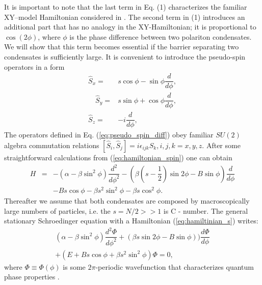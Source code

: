 \documentclass[fleqn,10pt]{wlscirep}
\begin{document}
It is important to note that the last term in Eq. (1) characterizes the familiar XY--model Hamiltonian  considered in
\cite{Lago1, Lago2}.
The second term in (1) introduces an additional part that has no analogy in the XY-Hamiltonian; it is proportional to $\cos(2\phi)$, where $\phi$ is the phase difference between two polariton condensates.
We will show that this term becomes essential if the barrier separating two condensates is sufficiently large.
It is convenient to introduce the pseudo-spin operators in a form
% 
\begin{subequations}
\begin{align}
\hat{S}_x = & s \cos{\phi} - \sin{\phi} \dfrac{d}{d \phi}, \\
\quad \hat{S}_y = & s \sin{\phi} + \cos{\phi} \dfrac{d}{d \phi}, \\
\hat{S}_z = & -i\dfrac{d}{d \phi},
\end{align}
\label{eq:pseudo_spin_diff}
\end{subequations}
%
The operators defined in Eq. (\ref{eq:pseudo_spin_diff}) obey familiar $SU(2)$ algebra commutation relations $[\hat{S}_i, \hat{S}_j] = i\epsilon_{ijk}\hat{S}_k,  i,j,k=x,y,z$.
After some straightforward calculations from (\ref{eq:hamiltonian_spin}) one can obtain
%
\begin{equation}
\begin{array}{lcl}
H & = & -(\alpha - \beta \sin^2 \phi) \dfrac{d^2}{d \phi^2} - (\beta(s-\dfrac{1}{2})\sin{2\phi} - B\sin{\phi}) \dfrac{d}{d \phi} \\
&& - Bs \cos \phi - \beta s^2 \sin^2 \phi - \beta s \cos^2 \phi.
\end{array}
\label{eq:hamiltinian_s}
\end{equation}
%
Thereafter we assume that both condensates are composed by macroscopically large numbers of particles, i.e. the $s = N/2 >> 1$ is C - number.
The general stationary Schroedinger equation with a Hamiltonian (\ref{eq:hamiltinian_s}) writes:
%
\begin{equation}
\begin{array}{l}
(\alpha - \beta \sin^2 \phi) \dfrac{d^2 \Phi}{d \phi^2} + (\beta s\sin{2\phi}-B\sin{\phi})) \dfrac{d \Phi}{d \phi} \\
+ (E + B s \cos \phi + \beta s^2 \sin^2 \phi) \Phi = 0,
\end{array}
\label{eq:schrodinger}
\end{equation}
%
where $\Phi \equiv \Phi(\phi)$ is some $2\pi$-periodic wavefunction that characterizes quantum phase properties \cite{Anglin}.
\end{document}
